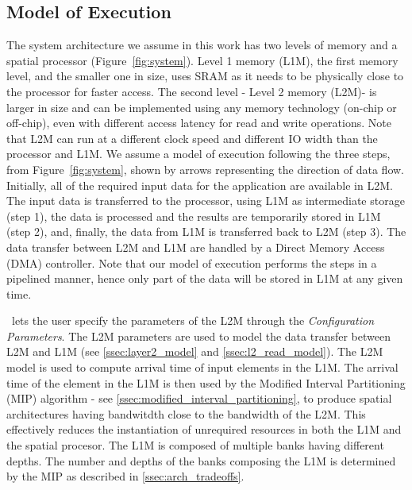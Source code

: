\vspace{-1mm}
\subsection{Model of Execution}
\label{ssec:system_under_analysis}
\vspace{-1mm}
The system architecture we assume in this work has two levels of memory and a spatial processor (Figure~\ref{fig:system}). Level 1 memory (L1M)\footnotemark, the first memory level, and the smaller one in size, uses SRAM as it needs to be physically close to the processor for faster access. The second level - Level 2 memory (L2M)\footnotemark[\value{footnote}] - is larger in size and can be implemented using any memory technology (on-chip or off-chip), even with different access latency for read and write operations. Note that L2M can run at a different clock speed and different IO width than the processor and L1M.
We assume a model of execution following the three steps, from Figure~\ref{fig:system}, shown by arrows representing the direction of data flow. Initially, all of the required input data for the application are available in L2M. The input data is transferred to the processor, using L1M as intermediate storage (step 1), the data is processed and the results are temporarily stored in L1M (step 2), and, finally, the data from L1M is transferred back to L2M (step 3). The data transfer between L2M and L1M are handled by a Direct Memory Access (DMA) controller. Note that our model of execution performs the steps in a pipelined manner, hence only part of the data will be stored in L1M at any given time.

\frameworkname~lets the user specify the parameters of the L2M through the \textit{Configuration Parameters}. The L2M parameters are used to model the data transfer between L2M and L1M (see \ref{ssec:layer2_model} and \ref{ssec:l2_read_model}). The L2M model is used to compute arrival time of input elements in the L1M. The arrival time of the element in the L1M is then used by the Modified Interval Partitioning (MIP) algorithm  - see \ref{ssec:modified_interval_partitioning}, to produce spatial architectures having bandwitdth close to the bandwidth of the L2M. This effectively reduces the instantiation of unrequired resources in both the L1M and the spatial procesor.
The L1M is composed of multiple banks having different depths. The number and depths of the banks composing the L1M is determined by the MIP as described in \ref{ssec:arch_tradeoffs}.

